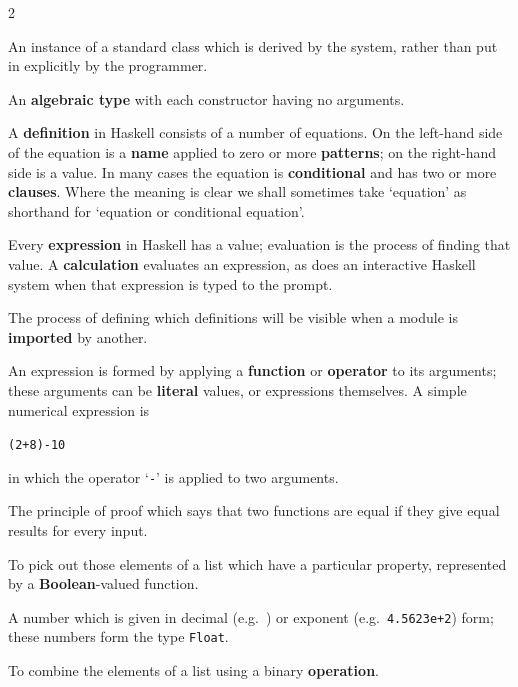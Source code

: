 \begin{multicols}{2}
{
An instance of a standard class which is derived by the system, rather than
put in explicitly by the programmer. 

An \textbf{algebraic type} with each constructor having no arguments.

A \textbf{definition} in Haskell consists of a number of equations. On the left-hand side of the equation is a \textbf{name} applied to zero or more 
\textbf{patterns}; on the right-hand side is a value. In many
cases the equation is \textbf{conditional} and has two or more
\textbf{clauses}. Where the meaning is clear we shall sometimes
take `equation' as shorthand for `equation or conditional
equation'.

Every \textbf{expression} in Haskell has a value; evaluation is the process of
finding that value. A \textbf{calculation} evaluates an expression, as does
an interactive
Haskell system when that expression is typed to the prompt.

The process of defining which definitions will be visible when a module is
\textbf{imported} by another.

An expression is formed by applying a \textbf{function} or \textbf{operator} to its
arguments; these arguments can be \textbf{literal} values, or expressions
themselves. A simple numerical expression is 
\begin{alltt}
(2+8)-10
\end{alltt}
in which the
operator `\texttt{-}' is applied to two arguments.

The principle of proof which says that two functions are equal if they give
equal results for every input.

To pick out those elements of a list which have a particular property,
represented by a \textbf{Boolean}-valued function.

A number which is given in decimal (e.g.\ {}) or exponent (e.g.\
\texttt{4.5623e+2}) form; these numbers form the type \texttt{Float}.

To combine the elements of a list using a binary \textbf{operation}.

}
\end{multicols}
